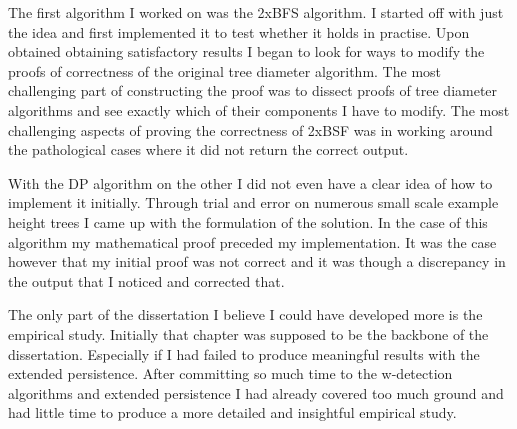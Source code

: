 The first algorithm I worked on was the 2xBFS algorithm. I started off with just the idea and first implemented it to test whether it holds in practise. Upon obtained obtaining satisfactory results I began to look for ways to modify the proofs of correctness of the original tree diameter algorithm. The most challenging part of constructing the proof was to dissect proofs of tree diameter algorithms and see exactly which of their components I have to modify. The most challenging aspects of proving the correctness of 2xBSF was in working around the pathological cases where it did not return the correct output.

%

With the DP algorithm on the other I did not even have a clear idea of how to implement it initially. Through trial and error on numerous small scale example height trees I came up with the formulation of the solution. In the case of this algorithm my mathematical proof preceded my implementation. It was the case however that my initial proof was not correct and it was though a discrepancy in the output that I noticed and corrected that.

The only part of the dissertation I believe I could have developed more is the empirical study. Initially that chapter was supposed to be the backbone of the dissertation. Especially if I had failed to produce meaningful results with the extended persistence. After committing so much time to the w-detection algorithms and extended persistence I had already covered too much ground and had little time to produce a more detailed and insightful empirical study.

